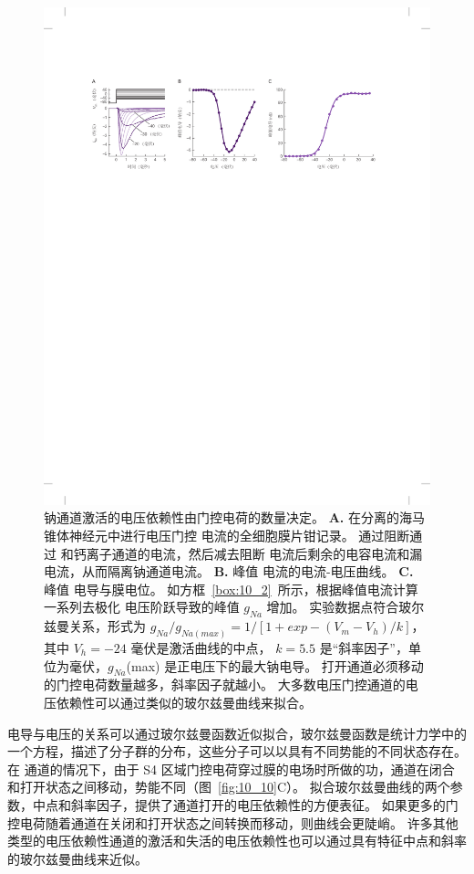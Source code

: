 \begin{figure}[htbp]
	\centering
	\includegraphics[width=1.0\linewidth]{chap10/fig_10_11}
	\caption{钠通道激活的电压依赖性由门控电荷的数量决定。
		\textbf{A.} 在分离的海马锥体神经元中进行电压门控  电流的全细胞膜片钳记录。
		通过阻断通过  和钙离子通道的电流，然后减去阻断  电流后剩余的电容电流和漏电流，从而隔离钠通道电流。
		\textbf{B.} 峰值  电流的电流-电压曲线。
		\textbf{C.} 峰值  电导与膜电位。 如方框~\ref{box:10_2}~所示，根据峰值电流计算一系列去极化
		电压阶跃导致的峰值 $g_{Na}$ 增加。
		实验数据点符合玻尔兹曼关系，形式为 $g_{Na} / g_{Na(max)} = 1 / [1 + exp - (V_m - V_h) / k]$，其中 $V_h = −24$ 毫伏是激活曲线的中点， $k = 5.5$ 是“斜率因子”，单位为毫伏，$g_{Na}$(max) 是正电压下的最大钠电导。
		打开通道必须移动的门控电荷数量越多，斜率因子就越小。
		大多数电压门控通道的电压依赖性可以通过类似的玻尔兹曼曲线来拟合。}
	\label{fig:10_11}
\end{figure}


电导与电压的关系可以通过玻尔兹曼函数近似拟合，玻尔兹曼函数是统计力学中的一个方程，描述了分子群的分布，这些分子可以以具有不同势能的不同状态存在。
在  通道的情况下，由于 S4 区域门控电荷穿过膜的电场时所做的功，通道在闭合和打开状态之间移动，势能不同（图~\ref{fig:10_10}C）。
拟合玻尔兹曼曲线的两个参数，中点和斜率因子，提供了通道打开的电压依赖性的方便表征。
如果更多的门控电荷随着通道在关闭和打开状态之间转换而移动，则曲线会更陡峭。
许多其他类型的电压依赖性通道的激活和失活的电压依赖性也可以通过具有特征中点和斜率的玻尔兹曼曲线来近似。


